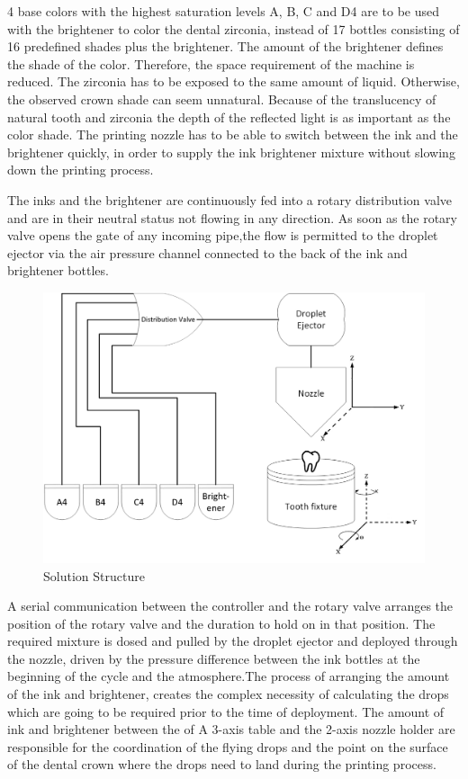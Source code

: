 4 base colors with the highest saturation levels A, B, C and D4 are to be used with the brightener to color the dental zirconia, instead of 17 bottles consisting of 16 predefined shades plus the brightener. The amount of the brightener defines the shade of the color. Therefore, the space requirement of the machine is reduced. The zirconia has to be exposed to the same amount of liquid. Otherwise, the observed crown shade can seem unnatural. Because of the translucency of natural tooth and zirconia the depth of the reflected light is as important as the color shade. The printing nozzle has to be able to switch between the ink and the brightener quickly, in order to supply the ink brightener mixture without slowing down the printing process. 

The inks and the brightener are continuously fed into a rotary distribution valve and are in their neutral status not flowing in any direction. As soon as the rotary valve opens the gate of any incoming pipe,the flow is permitted to the droplet ejector via the air pressure channel connected to the back of the ink and brightener bottles.  

\bigskip

\begin{figure}[H]
	\centering
	\includegraphics[width=1\textwidth]{grafiken/SolutionStructure.jpg}
	\caption{Solution Structure}
	\label{fig:SolutionStructure}
\end{figure} 

\bigskip

A serial communication between the controller and the rotary valve arranges the position of the rotary valve and the duration to hold on in that position. The required mixture is dosed and pulled by the droplet ejector and deployed through the nozzle, driven by the pressure difference between the ink bottles at the beginning of the cycle and the atmosphere.The process of arranging the amount of the ink and brightener, creates the complex necessity of calculating the drops which are going to be required prior to the time of deployment. The amount of ink and brightener between the  of  A 3-axis table and the 2-axis nozzle holder are responsible for the coordination of the flying drops and the point on the surface of the dental crown where the drops need to land during the printing process.

